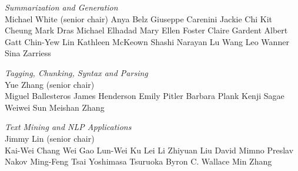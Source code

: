 \emph{Summarization and Generation} \\
\hspace*{0.2in}Michael White (senior chair)
\hspace*{0.2in}Anya Belz
\hspace*{0.2in}Giuseppe Carenini
\hspace*{0.2in}Jackie Chi Kit Cheung
\hspace*{0.2in}Mark Dras
\hspace*{0.2in}Michael Elhadad
\hspace*{0.2in}Mary Ellen Foster
\hspace*{0.2in}Claire Gardent
\hspace*{0.2in}Albert Gatt
\hspace*{0.2in}Chin-Yew Lin
\hspace*{0.2in}Kathleen McKeown
\hspace*{0.2in}Shashi Narayan
\hspace*{0.2in}Lu Wang
\hspace*{0.2in}Leo Wanner
\hspace*{0.2in}Sina Zarriess


\emph{Tagging, Chunking, Syntax and Parsing} \\
\hspace*{0.2in}Yue Zhang (senior chair) \\ 
\hspace*{0.2in}Miguel Ballesteros
\hspace*{0.2in}James Henderson
\hspace*{0.2in}Emily Pitler
\hspace*{0.2in}Barbara Plank
\hspace*{0.2in}Kenji Sagae
\hspace*{0.2in}Weiwei Sun
\hspace*{0.2in}Meishan Zhang


\emph{Text Mining and NLP Applications} \\
\hspace*{0.2in}Jimmy Lin (senior chair) \\
\hspace*{0.2in}Kai-Wei Chang
\hspace*{0.2in}Wei Gao
\hspace*{0.2in}Lun-Wei Ku
\hspace*{0.2in}Lei Li
\hspace*{0.2in}Zhiyuan Liu
\hspace*{0.2in}David Mimno
\hspace*{0.2in}Preslav Nakov
\hspace*{0.2in}Ming-Feng Tsai
\hspace*{0.2in}Yoshimasa Tsuruoka
\hspace*{0.2in}Byron C. Wallace
\hspace*{0.2in}Min Zhang


